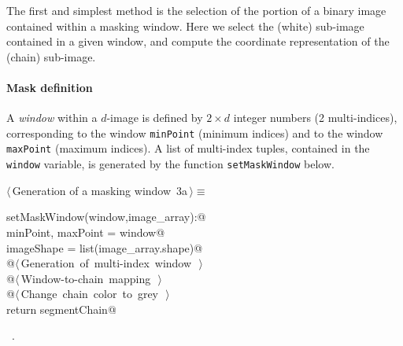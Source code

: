 \documentclass[11pt,oneside]{article}	%
\begin{document}
The first and simplest method is the selection of the portion of a binary image contained within a masking window.
Here we select the (white) sub-image contained in a given window, and compute the coordinate representation of the (chain) sub-image.

\paragraph{Mask definition}

A \emph{window} within a $d$-image is defined by $2\times d$ integer numbers (2 multi-indices), corresponding to the window  \texttt{minPoint} (minimum indices) and to the window \texttt{maxPoint} (maximum indices). A list of multi-index tuples, contained in the \texttt{window} variable, is generated by the function \texttt{setMaskWindow} below.

\begin{flushleft} \small
\begin{minipage}{\linewidth} \label{scrap4}
\protect{}$\langle\,$Generation of a masking window\nobreak\ {\footnotesize 3a}$\,\rangle\equiv$
\vspace{-1ex}
\begin{list}{}{} \item
\mbox{}\verb@def setMaskWindow(window,image_array):@\\
\mbox{}\verb@   minPoint, maxPoint = window@\\
\mbox{}\verb@   imageShape = list(image_array.shape)@\\
\mbox{}\verb@   @\hbox{$\langle\,$Generation of multi-index window\nobreak\ {\footnotesize {}}$\,\rangle$}\verb@@\\
\mbox{}\verb@   @\hbox{$\langle\,$Window-to-chain mapping\nobreak\ {\footnotesize {}}$\,\rangle$}\verb@@\\
\mbox{}\verb@   @\hbox{$\langle\,$Change chain color to grey\nobreak\ {\footnotesize {}}$\,\rangle$}\verb@@\\
\mbox{}\verb@   return segmentChain@\\
\mbox{}\verb@@{\NWsep}
\end{list}
\vspace{-1ex}
\footnotesize\addtolength{\baselineskip}{-1ex}
\begin{list}{}{\setlength{\itemsep}{-\parsep}\setlength{\itemindent}{-\leftmargin}}
\item \NWtxtMacroRefIn\ .
\end{list}
\end{minipage}\\[4ex]
\end{flushleft}
\end{document}
